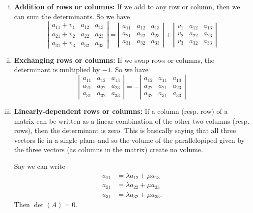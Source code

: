 \begin{enumerate}[(i)]
            \item \textbf{Addition of rows or columns:} If  we add to any row or column, then we can sum the determinants.  So we have
            \[
            \left| \begin{array}{ccc}
                a_{11} + v_1 & a_{12} & a_{13} \\
                a_{21} + v_2 & a_{22} & a_{23} \\
                a_{31} + v_3 & a_{32} & a_{33}
            \end{array}\right|=\left| \begin{array}{ccc}
                a_{11} & a_{12} & a_{13} \\
                a_{21} & a_{22} & a_{23} \\
                a_{31} & a_{32} & a_{33}
            \end{array}\right|+\left| \begin{array}{ccc}
                v_1 & a_{12} & a_{13} \\
                v_2 & a_{22} & a_{23} \\
                v_3 & a_{32} & a_{33}
            \end{array}\right|
            \]
            
            \item \textbf{Exchanging rows or columns:} If we swap rows or columns, the determinant is multiplied by $-1$. So we have
            \[
            \left|\begin{array}{ccc}
                a_{11} & a_{12} & a_{13} \\
                a_{21} & a_{22} & a_{23} \\
                a_{31} & a_{32} & a_{33}
            \end{array}\right|=-
            \left|\begin{array}{ccc}
                a_{12} & a_{11} & a_{13} \\
                a_{22} & a_{21} & a_{23} \\
                a_{32} & a_{31} & a_{33}
            \end{array}\right|
            \]
            
            \item \textbf{Linearly-dependent rows or columns:} If a column (resp. row) of a matrix can be written as a linear combination of the other two columns (resp. rows), then the determinant is zero.  This is basically saying that all three vectors lie in a single plane and so the volume of the parallelopiped given by the three vectors (as columns in the matrix) create no volume.
            
            Say we can write
            \begin{align*}
                a_{11}&=\lambda a_{12} + \mu a_{13}\\
                a_{21}&=\lambda a_{22} + \mu a_{23}\\
                a_{31}&=\lambda a_{32} + \mu a_{33}.
            \end{align*}
            Then $\det(A)=0.$
        \end{enumerate}
        
